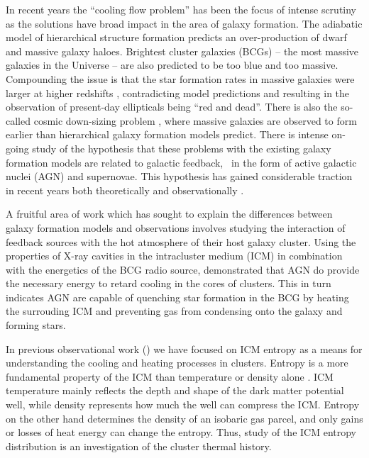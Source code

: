 \documentclass{emulateapj}
\begin{document}
In recent years the ``cooling flow problem'' has been the focus of
intense scrutiny as the solutions have broad impact in the area of
galaxy formation. The adiabatic model of hierarchical structure
formation predicts an over-production of dwarf and massive galaxy
haloes. Brightest cluster galaxies (BCGs) -- the most massive galaxies
in the Universe -- are also predicted to be too blue and too massive.
Compounding the issue is that the star formation rates in massive
galaxies were larger at higher redshifts \citep{1996AJ....112..839C,
  2005ApJ...619L.135J}, contradicting model predictions and resulting
in the observation of present-day ellipticals being ``red and dead''.
There is also the so-called cosmic down-sizing problem
\citep{1996AJ....112..839C}, where massive galaxies are observed to
form earlier than hierarchical galaxy formation models predict. There
is intense on-going study of the hypothesis that these problems with
the existing galaxy formation models are related to galactic feedback,
\ie\ in the form of active galactic nuclei (AGN) and supernovae. This
hypothesis has gained considerable traction in recent years both
theoretically \citep{bower06, croton06} and observationally
\citep{peterson2003, mcnamrev}.

A fruitful area of work which has sought to explain the differences
between galaxy formation models and observations involves studying the
interaction of feedback sources with the hot atmosphere of their host
galaxy cluster.  Using the properties of X-ray cavities in the
intracluster medium (ICM) in combination with the energetics of the
BCG radio source, \cite{birzan04} demonstrated that AGN do provide the
necessary energy to retard cooling in the cores of clusters. This in
turn indicates AGN are capable of quenching star formation in the BCG
by heating the surrouding ICM and preventing gas from condensing onto
the galaxy and forming stars.

In previous observational work (\citealt{radioquiet, dhc06, accept2})
we have focused on ICM entropy as a means for understanding the
cooling and heating processes in clusters. Entropy is a more
fundamental property of the ICM than temperature or density alone
\citep{voitbryan,voitreview}. ICM temperature mainly reflects the
depth and shape of the dark matter potential well, while density
represents how much the well can compress the ICM.  Entropy on the
other hand determines the density of an isobaric gas parcel, and only
gains or losses of heat energy can change the entropy. Thus, study of
the ICM entropy distribution is an investigation of the cluster
thermal history.
\end{document}
